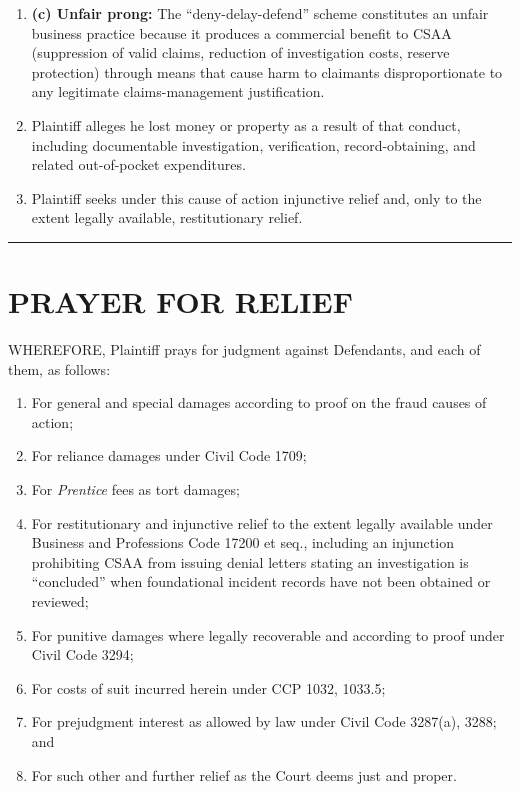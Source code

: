 \begin{enumerate}
\def\labelenumi{\arabic{enumi}.}
\setcounter{enumi}{66}
\item
  \textbf{(c) Unfair prong:} The ``deny-delay-defend'' scheme constitutes an unfair business practice because it produces a commercial benefit to CSAA (suppression of valid claims, reduction of investigation costs, reserve protection) through means that cause harm to claimants disproportionate to any legitimate claims-management justification.
\item
  Plaintiff alleges he lost money or property as a result of that conduct, including documentable investigation, verification, record-obtaining, and related out-of-pocket expenditures.
\item
  Plaintiff seeks under this cause of action injunctive relief and, only to the extent legally available, restitutionary relief.
\end{enumerate}

\begin{center}\rule{0.5\linewidth}{0.5pt}\end{center}

\label{toc:prayer-for-relief}
\section{PRAYER FOR RELIEF}\label{prayer-for-relief}

WHEREFORE, Plaintiff prays for judgment against Defendants, and each of them, as follows:

\begin{enumerate}
\def\labelenumi{\arabic{enumi}.}
\item
  For general and special damages according to proof on the fraud causes of action;
\item
  For reliance damages under Civil Code \textsection{} 1709;
\item
  For \emph{Prentice} fees as tort damages;
\item
  For restitutionary and injunctive relief to the extent legally available under Business and Professions Code \textsection{} 17200 et seq., including an injunction prohibiting CSAA from issuing denial letters stating an investigation is ``concluded'' when foundational incident records have not been obtained or reviewed;
\item
  For punitive damages where legally recoverable and according to proof under Civil Code \textsection{} 3294;
\item
  For costs of suit incurred herein under CCP \textsection{}\textsection{} 1032, 1033.5;
\item
  For prejudgment interest as allowed by law under Civil Code \textsection{}\textsection{} 3287(a), 3288; and
\item
  For such other and further relief as the Court deems just and proper.
\end{enumerate}

